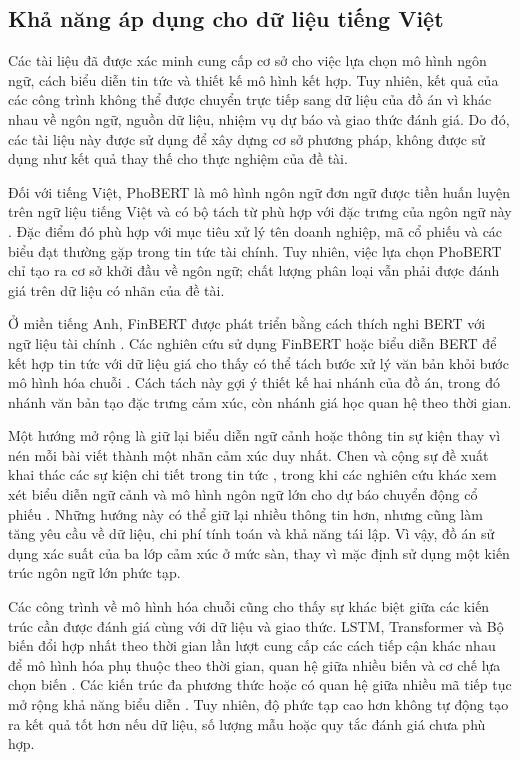 \subsection{Khả năng áp dụng cho dữ liệu tiếng Việt}

Các tài liệu đã được xác minh cung cấp cơ sở cho việc lựa chọn mô hình ngôn ngữ, cách
biểu diễn tin tức và thiết kế mô hình kết hợp. Tuy nhiên, kết quả của các công trình
không thể được chuyển trực tiếp sang dữ liệu của đồ án vì khác nhau về ngôn ngữ, nguồn
dữ liệu, nhiệm vụ dự báo và giao thức đánh giá. Do đó, các tài liệu này được sử dụng để
xây dựng cơ sở phương pháp, không được sử dụng như kết quả thay thế cho thực nghiệm của
đề tài.

Đối với tiếng Việt, PhoBERT là mô hình ngôn ngữ đơn ngữ được tiền huấn luyện trên ngữ
liệu tiếng Việt và có bộ tách từ phù hợp với đặc trưng của ngôn ngữ này
\cite{Nguyen2020_200300744v3}. Đặc điểm đó phù hợp với mục tiêu xử lý tên doanh nghiệp,
mã cổ phiếu và các biểu đạt thường gặp trong tin tức tài chính. Tuy nhiên, việc lựa chọn
PhoBERT chỉ tạo ra cơ sở khởi đầu về ngôn ngữ; chất lượng phân loại vẫn phải được đánh
giá trên dữ liệu có nhãn của đề tài.

Ở miền tiếng Anh, FinBERT được phát triển bằng cách thích nghi BERT với ngữ liệu tài
chính \cite{Yang2020_200608097v2}. Các nghiên cứu sử dụng FinBERT hoặc biểu diễn BERT
để kết hợp tin tức với dữ liệu giá cho thấy có thể tách bước xử lý văn bản khỏi bước
mô hình hóa chuỗi \cite{Halder2022_221107392v1,Gu2024_240716150v1,
Chen2021_210708721v1}. Cách tách này gợi ý thiết kế hai nhánh của đồ án, trong đó nhánh
văn bản tạo đặc trưng cảm xúc, còn nhánh giá học quan hệ theo thời gian.

Một hướng mở rộng là giữ lại biểu diễn ngữ cảnh hoặc thông tin sự kiện thay vì nén mỗi
bài viết thành một nhãn cảm xúc duy nhất. Chen và cộng sự đề xuất khai thác các sự kiện
chi tiết trong tin tức \cite{Chen2019_191005078v1}, trong khi các nghiên cứu khác xem
xét biểu diễn ngữ cảnh và mô hình ngôn ngữ lớn cho dự báo chuyển động cổ phiếu
\cite{Chen2021_210708721v1,Elahi2024_241101368v1,Liang2024_241210823v2}. Những hướng
này có thể giữ lại nhiều thông tin hơn, nhưng cũng làm tăng yêu cầu về dữ liệu, chi phí
tính toán và khả năng tái lập. Vì vậy, đồ án sử dụng xác suất của ba lớp cảm xúc ở mức
sàn, thay vì mặc định sử dụng một kiến trúc ngôn ngữ lớn phức tạp.

Các công trình về mô hình hóa chuỗi cũng cho thấy sự khác biệt giữa các kiến trúc cần
được đánh giá cùng với dữ liệu và giao thức. LSTM, Transformer và Bộ biến đổi hợp nhất theo thời gian lần lượt cung cấp các cách tiếp cận khác nhau để mô hình hóa phụ thuộc theo
thời gian, quan hệ giữa nhiều biến và cơ chế lựa chọn biến
\cite{Hochreiter1997_lstm,Vaswani2017_attention,Lim2021_tft}. Các kiến trúc đa phương
thức hoặc có quan hệ giữa nhiều mã tiếp tục mở rộng khả năng biểu diễn
\cite{Omranpour2024_241210540v1,Boyle2023_230503835v1,Xu2021_211013716v2,
Zhao2023_230609862v3}. Tuy nhiên, độ phức tạp cao hơn không tự động tạo ra kết quả tốt
hơn nếu dữ liệu, số lượng mẫu hoặc quy tắc đánh giá chưa phù hợp.

